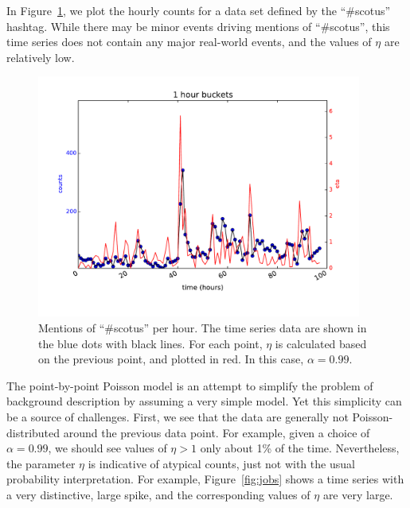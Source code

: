 \documentclass{article}
\begin{document}
In Figure~\ref{fig:scotus1}, we plot the hourly counts for a
data set defined by the ``\#scotus'' hashtag. While there may be minor events
driving mentions of ``\#scotus'', this time series does not contain any major
real-world events, and the values of $\eta$ are relatively low.

\begin{figure} 
\begin{center}
\includegraphics[width=0.95\textwidth]{fig/scotus_pbppm.pdf} \caption{Mentions
of ``\#scotus'' per hour. The time series data are shown in the blue dots with
black lines. For each point, $\eta$ is calculated based on the previous point, and
plotted in red. In this case, $\alpha=0.99$. }
\label{fig:scotus1}
\end{center}
\end{figure}

The point-by-point Poisson model is an attempt to simplify the problem of
background description by assuming a very simple model. Yet this
simplicity can be a source of challenges. First, we see that the data are
generally not Poisson-distributed around the previous data point. For example,
given a choice of $\alpha=0.99$, we should see values of $\eta>1$ only about 1\% of the
time. Nevertheless, the parameter $\eta$ is indicative of atypical counts, just not with
the usual probability interpretation. For example, Figure~\ref{fig:jobs} shows a time series with a
very distinctive, large spike, and the corresponding values of $\eta$ are very 
large.
\end{document}
